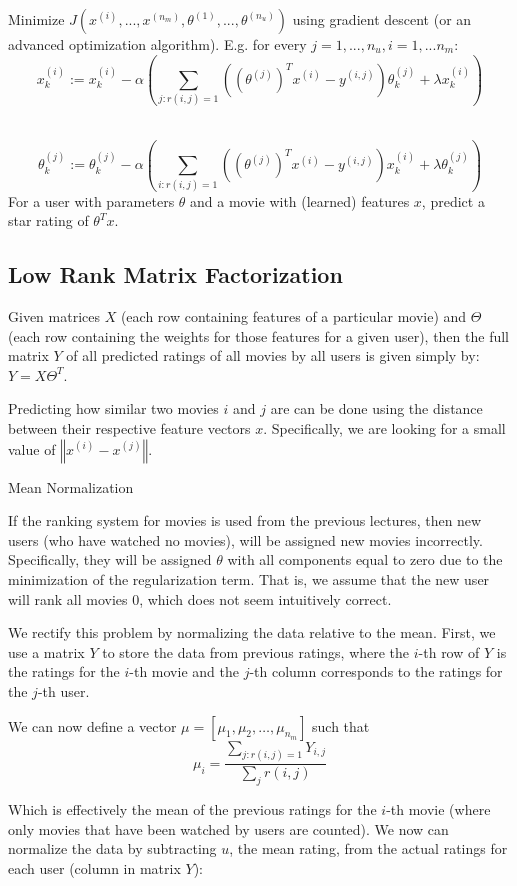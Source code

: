 \documentclass[a4paper,11pt]{report}
\newcommand{\norm}[1]{\left\Vert#1\right\Vert}
\begin{document}
Minimize $J(x^{(i)},...,x^{(n_m)},\theta^{(1)},...,\theta^{(n_u)})$ using gradient descent (or an advanced optimization algorithm). E.g. for every $j=1,...,n_u, i=1,...n_m$:
$$x_k^{(i)} := x_k^{(i)} - \alpha\left (\displaystyle \sum_{j:r(i,j)=1}{((\theta^{(j)})^T x^{(i)} - y^{(i,j)}) \theta_k^{(j)}} + \lambda x_k^{(i)} \right)$$

​$$\theta_k^{(j)} := \theta_k^{(j)} - \alpha\left (\displaystyle \sum_{i:r(i,j)=1}{((\theta^{(j)})^T x^{(i)} - y^{(i,j)}) x_k^{(i)}} + \lambda \theta_k^{(j)} \right)$$
​	​	
For a user with parameters $\theta$ and a movie with (learned) features $x$, predict a star rating of $\theta^Tx$.

\subsection*{Low Rank Matrix Factorization}

Given matrices $X$ (each row containing features of a particular movie) and $\Theta$ (each row containing the weights for those features for a given user), then the full matrix $Y$ of all predicted ratings of all movies by all users is given simply by: $Y=X\Theta^T$.

Predicting how similar two movies $i$ and $j$ are can be done using the distance between their respective feature vectors $x$. Specifically, we are looking for a small value of $\norm{x^{(i)} - x^{(j)}}$.

Mean Normalization

If the ranking system for movies is used from the previous lectures, then new users (who have watched no movies), will be assigned new movies incorrectly. Specifically, they will be assigned $\theta$ with all components equal to zero due to the minimization of the regularization term. That is, we assume that the new user will rank all movies 0, which does not seem intuitively correct.

We rectify this problem by normalizing the data relative to the mean. First, we use a matrix $Y$ to store the data from previous ratings, where the $i$-th row of $Y$ is the ratings for the $i$-th movie and the $j$-th column corresponds to the ratings for the $j$-th user.

We can now define a vector $\mu = [\mu_1, \mu_2, \dots , \mu_{n_m}]$ such that $$\mu_i = \frac{\sum_{j:r(i,j)=1}{Y_{i,j}}}{\sum_{j}{r(i,j)}}$$

Which is effectively the mean of the previous ratings for the $i$-th movie (where only movies that have been watched by users are counted). We now can normalize the data by subtracting $u$, the mean rating, from the actual ratings for each user (column in matrix $Y$):
\end{document}
